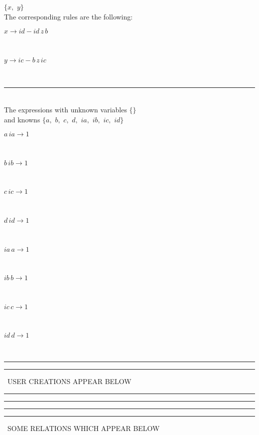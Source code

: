 \documentclass[rep10,leqno]{report}
\begin{document}
$\{x,
$ $
y\}$
\smallskip\\
The corresponding rules are the following:\smallskip\\
\begin{minipage}{6in}
$
x\rightarrow id - id\,
 z\,
 b
$
\end{minipage}\medskip\\
\begin{minipage}{6in}
$
y\rightarrow ic - b\,
 z\,
 ic
$
\end{minipage}\medskip\\
\rule[3pt]{6in}{.7pt}\\
The expressions with unknown variables $\{\}$\\
and knowns $\{a,
$ $
b,
$ $
c,
$ $
d,
$ $
ia,
$ $
ib,
$ $
ic,
$ $
id\}$\smallskip\\
\begin{minipage}{6in}
$
a\,
 ia\rightarrow 1
$
\end{minipage}\medskip \\
\begin{minipage}{6in}
$
b\,
 ib\rightarrow 1
$
\end{minipage}\medskip \\
\begin{minipage}{6in}
$
c\,
 ic\rightarrow 1
$
\end{minipage}\medskip \\
\begin{minipage}{6in}
$
d\,
 id\rightarrow 1
$
\end{minipage}\medskip \\
\begin{minipage}{6in}
$
ia\,
 a\rightarrow 1
$
\end{minipage}\medskip \\
\begin{minipage}{6in}
$
ib\,
 b\rightarrow 1
$
\end{minipage}\medskip \\
\begin{minipage}{6in}
$
ic\,
 c\rightarrow 1
$
\end{minipage}\medskip \\
\begin{minipage}{6in}
$
id\,
 d\rightarrow 1
$
\end{minipage}\\
\rule[2pt]{6in}{1pt}\hfil\break
\rule[2.5pt]{1.701in}{1pt}
\ USER CREATIONS APPEAR BELOW\ 
\rule[2.5pt]{1.701in}{1pt}\hfil\break
\rule[2pt]{6in}{1pt}\hfil\break
\rule[2pt]{6in}{4pt}\hfil\break
\rule[2pt]{1.45in}{4pt}
\ SOME RELATIONS WHICH APPEAR BELOW\ 
\end{document}
